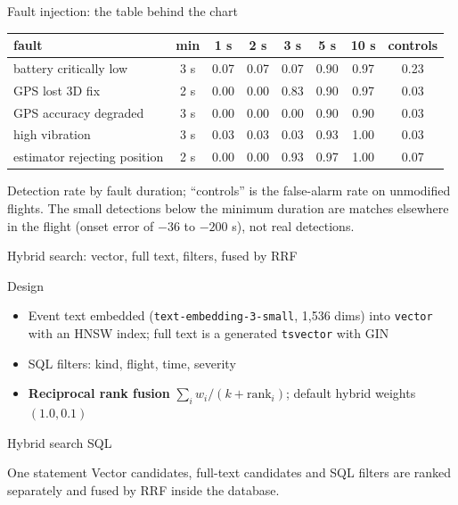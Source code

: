 \documentclass[aspectratio=169,10pt]{beamer}
\newcommand{\code}[1]{\texttt{\footnotesize #1}}
\newcommand{\listingr}[3]{}
\begin{document}
\begin{frame}[shrink=5]{Fault injection: the table behind the chart}
\centering
\begin{tabular}{@{}lccccccc@{}}
\toprule
fault & min & 1 s & 2 s & 3 s & 5 s & 10 s & controls\\
\midrule
battery critically low & 3 s & 0.07 & 0.07 & 0.07 & 0.90 & 0.97 & 0.23\\
GPS lost 3D fix & 2 s & 0.00 & 0.00 & 0.83 & 0.90 & 0.97 & 0.03\\
GPS accuracy degraded & 3 s & 0.00 & 0.00 & 0.00 & 0.90 & 0.90 & 0.03\\
high vibration & 3 s & 0.03 & 0.03 & 0.03 & 0.93 & 1.00 & 0.03\\
estimator rejecting position & 2 s & 0.00 & 0.00 & 0.93 & 0.97 & 1.00 & 0.07\\
\bottomrule
\end{tabular}\par\vspace{0.5em}
{\footnotesize Detection rate by fault duration; ``controls'' is the false-alarm rate on unmodified flights. The small detections below the minimum duration are matches elsewhere in the flight (onset error of $-36$ to $-200$ s), not real detections.}
\end{frame}

\begin{frame}[shrink=5]{Hybrid search: vector, full text, filters, fused by RRF}
\begin{block}{Design}
\begin{itemize}
  \item Event text embedded (\code{text-embedding-3-small}, 1,536 dims) into \code{vector} with an HNSW index; full text is a generated \code{tsvector} with GIN
  \item SQL filters: kind, flight, time, severity
  \item \textbf{Reciprocal rank fusion} $\sum_i w_i/(k+\mathrm{rank}_i)$; default hybrid weights $(1.0, 0.1)$
\end{itemize}
\end{block}
\end{frame}

\begin{frame}{Hybrid search SQL}
\begin{block}{One statement}
Vector candidates, full-text candidates and SQL filters are ranked separately and fused by RRF inside the database.
\end{block}
\vspace{0.3em}
\listingr{code-rrf-sql}{10}{26}
\end{frame}
\end{document}

